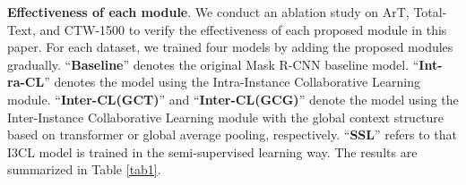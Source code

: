\begin{table*}
  \caption{Comparison results between the Mask R-CNN baseline and I3CL on three difficult subsets.}
  \label{tab2}
  \begin{center}
\vspace{-2mm}
\end{center}
\end{table*}



\textbf{Effectiveness of each module}. We conduct an ablation study on ArT, Total-Text, and CTW-1500 to verify the effectiveness of each proposed module in this paper. For each dataset, we trained four models by adding the proposed modules gradually. ``\textbf{Baseline}'' denotes the original Mask R-CNN baseline model. ``\textbf{Int-ra-CL}'' denotes the model using the Intra-Instance Collaborative Learning module. ``\textbf{Inter-CL(GCT)}'' and ``\textbf{Inter-CL(GCG)}'' denote the model using the Inter-Instance Collaborative Learning module with the global context structure based on transformer or global average pooling, respectively. ``\textbf{SSL}'' refers to that I3CL model is trained in the semi-supervised learning way. The results are summarized in Table \ref{tab1}. 

